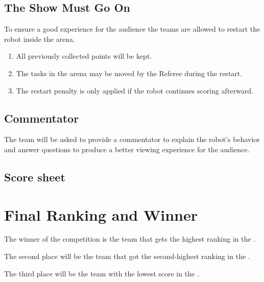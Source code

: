 \subsection{The Show Must Go On}
To ensure a good experience for the audience the teams are allowed to restart the robot inside the arena.
\begin{enumerate}[nosep]
  \item All previously collected points will be kept.
  \item The tasks in the arena may be moved by the Referee during the restart.
  \item The restart penalty is only applied if the robot continues scoring afterward.
\end{enumerate}

\subsection{Commentator}
The team will be asked to provide a commentator to explain the robot's behavior and answer questions to produce a better viewing experience for the audience.


\subsection*{Score sheet}


\section{Final Ranking and Winner}

The winner of the competition is the team that gets the highest ranking in the .

The second place will be the team that got the second-highest ranking in the .

The third place will be the team with the lowest score in the .


